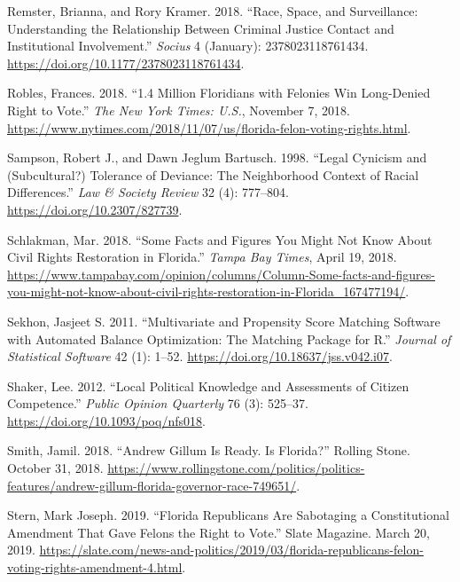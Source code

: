 \documentclass[
  12pt,
]{article}
\newlength{\cslhangindent}
\newenvironment{cslreferences}%
  {\setlength{\parindent}{0pt}%
  \everypar{\setlength{\hangindent}{\cslhangindent}}\ignorespaces}%
  {\par}
\begin{document}
\begin{cslreferences}
\leavevmode\hypertarget{ref-Remster2018}{}%
Remster, Brianna, and Rory Kramer. 2018. ``Race, Space, and Surveillance: Understanding the Relationship Between Criminal Justice Contact and Institutional Involvement.'' \emph{Socius} 4 (January): 2378023118761434. \url{https://doi.org/10.1177/2378023118761434}.

\leavevmode\hypertarget{ref-Robles2018}{}%
Robles, Frances. 2018. ``1.4 Million Floridians with Felonies Win Long-Denied Right to Vote.'' \emph{The New York Times: U.S.}, November 7, 2018. \url{https://www.nytimes.com/2018/11/07/us/florida-felon-voting-rights.html}.

\leavevmode\hypertarget{ref-Sampson1998}{}%
Sampson, Robert J., and Dawn Jeglum Bartusch. 1998. ``Legal Cynicism and (Subcultural?) Tolerance of Deviance: The Neighborhood Context of Racial Differences.'' \emph{Law \& Society Review} 32 (4): 777--804. \url{https://doi.org/10.2307/827739}.

\leavevmode\hypertarget{ref-Schlakman2018}{}%
Schlakman, Mar. 2018. ``Some Facts and Figures You Might Not Know About Civil Rights Restoration in Florida.'' \emph{Tampa Bay Times}, April 19, 2018. \url{https://www.tampabay.com/opinion/columns/Column-Some-facts-and-figures-you-might-not-know-about-civil-rights-restoration-in-Florida_167477194/}.

\leavevmode\hypertarget{ref-Sekhon2011}{}%
Sekhon, Jasjeet S. 2011. ``Multivariate and Propensity Score Matching Software with Automated Balance Optimization: The Matching Package for R.'' \emph{Journal of Statistical Software} 42 (1): 1--52. \url{https://doi.org/10.18637/jss.v042.i07}.

\leavevmode\hypertarget{ref-Shaker2012}{}%
Shaker, Lee. 2012. ``Local Political Knowledge and Assessments of Citizen Competence.'' \emph{Public Opinion Quarterly} 76 (3): 525--37. \url{https://doi.org/10.1093/poq/nfs018}.

\leavevmode\hypertarget{ref-Smith2018}{}%
Smith, Jamil. 2018. ``Andrew Gillum Is Ready. Is Florida?'' Rolling Stone. October 31, 2018. \url{https://www.rollingstone.com/politics/politics-features/andrew-gillum-florida-governor-race-749651/}.

\leavevmode\hypertarget{ref-Stern2019}{}%
Stern, Mark Joseph. 2019. ``Florida Republicans Are Sabotaging a Constitutional Amendment That Gave Felons the Right to Vote.'' Slate Magazine. March 20, 2019. \url{https://slate.com/news-and-politics/2019/03/florida-republicans-felon-voting-rights-amendment-4.html}.


\end{cslreferences}
\end{document}
